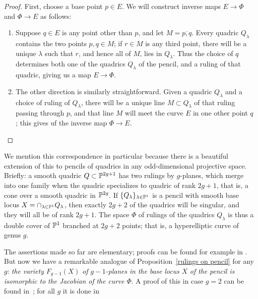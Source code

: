 \begin{proof}
First, choose a base point $p \in E$. We will construct inverse maps $E \to \Phi$ and $\Phi \to E$ as follows:
\begin{enumerate}
\item Suppose $q \in E$ is any point other than $p$, and let $M = \overline{p,q}$. Every quadric $Q_\lambda$ contains the two points $p, q \in M$; if $r \in M$ is any third point, there will be a unique $\lambda$ such that $r$, and hence all of $M$, lies in $Q_\lambda$. Thus the choice of $q$ determines both one of the quadrics $Q_\lambda$ of the pencil, and a ruling of that quadric, giving us a map $E \to \Phi$.
\item The other direction is similarly straightforward. Given a quadric $Q_\lambda$ and a choice of ruling of $Q_\lambda$, there will be a unique line $M \subset Q_\lambda$ of that ruling passing through $p$, and that line $M$ will meet the curve $E$ in one other point $q$; this gives uf the inverse map $\Phi \to E$.
\end{enumerate}
\end{proof}

We mention this correspondence in particular because there is a beautiful extension of this to pencils of quadrics in any odd-dimensional projective space. Briefly: a smooth quadric $Q \subset {\mathbb P}^{2g+1}$ has two rulings by $g$-planes, which merge into one family when the quadric specializes to quadric of rank $2g+1$, that is, a cone over a smooth quadric in ${\mathbb P}^{2g}$. If $\{Q_\lambda\}_{\lambda \in {\mathbb P}^1}$ is a pencil with smooth base locus $X = \cap_{\lambda \in {\mathbb P}^1} Q_\lambda$, then exactly $2g+2$ of the quadrics will be singular, and they will all be of rank $2g+1$. The space $\Phi$ of rulings of the quadrics $Q_\lambda$ is thus a double cover of ${\mathbb P}^1$ branched at $2g+2$ points; that is, a hyperelliptic curve of genus $g$.

The assertions made so far are elementary; proofs can be found for example in \cite{First Course book}. But now we have a remarkable analogue of Proposition~\ref{rulings on pencil} for any $g$: \emph{the variety $F_{g-1}(X)$ of $g-1$-planes in the base locus $X$ of the pencil is isomorphic to the Jacobian of the  curve $\Phi$}. A proof of this in case $g=2$ can be found in~\cite{Griffiths-Harris}; for all $g$ it is done in~\cite{Donagi paper}





